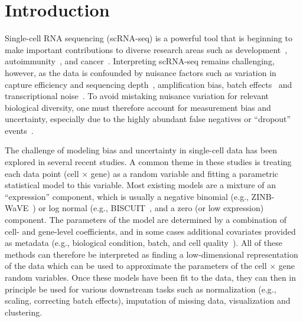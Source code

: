 \section{Introduction}
Single-cell RNA sequencing (scRNA-seq) is a powerful tool that is beginning to make important contributions to diverse research areas such as
development~\cite{Semrau2017},  autoimmunity~\cite{Gaublomme2015}, and cancer~\cite{Patel2014}.
Interpreting scRNA-seq remains challenging, however, as the data is confounded by nuisance factors such as variation in capture efficiency and sequencing depth~\cite{vallejos2017normalizing}, amplification bias, batch effects~\cite{shaham2017removal} and transcriptional noise~\cite{wagner2016revealing}. To avoid mistaking nuisance variation for relevant biological diversity, one must therefore account for measurement bias and uncertainty, especially due to the highly abundant false negatives or ``dropout'' events~\cite{kharchenko2014bayesian}.

The challenge of modeling bias and uncertainty in single-cell data has been explored in several recent studies. A common theme in these studies is treating each data point (cell $\times$ gene) as a random variable and fitting a parametric statistical model to this variable. Most existing models are a mixture of an ``expression'' component, which is usually a negative binomial (e.g., ZINB-WaVE~\cite{zinbwave}) or log normal (e.g., BISCUIT~\cite{biscuit}, and a zero (or low expression) component. The parameters of the model are determined by a combination of cell- and gene-level coefficients, and in some cases additional covariates provided as metadata (e.g., biological condition, batch, and cell quality~\cite{zinbwave}). All of these methods can therefore be interpreted as finding a low-dimensional representation of the data which can be used to approximate the parameters of the cell $\times$ gene random variables. Once these models have been fit to the data, they can then in principle be used for various downstream tasks such as normalization (e.g., scaling, correcting batch effects), imputation of missing data, visualization and clustering.

